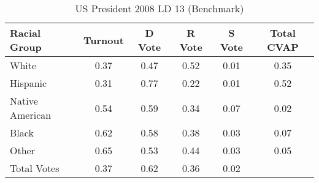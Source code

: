 \begin{table}[htb]
\begin{center}
\caption{US President 2008 LD 13 (Benchmark)}
\label{pres08_cvap_ld_13_benchmark}
\begin{tabular}{lccccc}
  \hline
Racial Group & Turnout & D Vote & R Vote & S Vote & Total CVAP \\ 
  \hline
White & 0.37 & 0.47 & 0.52 & 0.01 & 0.35 \\ 
  Hispanic & 0.31 & 0.77 & 0.22 & 0.01 & 0.52 \\ 
  Native American & 0.54 & 0.59 & 0.34 & 0.07 & 0.02 \\ 
  Black & 0.62 & 0.58 & 0.38 & 0.03 & 0.07 \\ 
  Other & 0.65 & 0.53 & 0.44 & 0.03 & 0.05 \\ 
  Total Votes & 0.37 & 0.62 & 0.36 & 0.02 &  \\ 
   \hline
\end{tabular}
\end{center}
\end{table}
